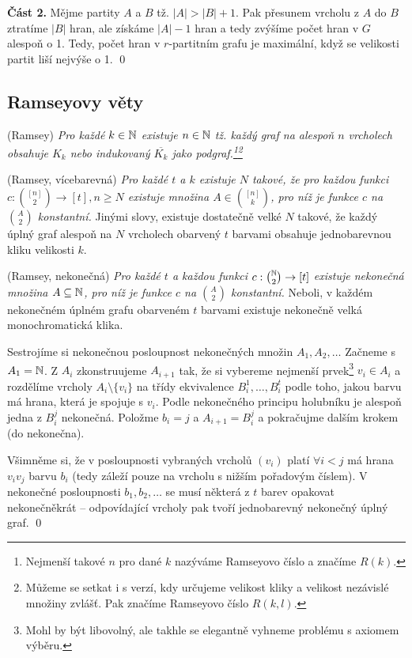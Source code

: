 \textbf{Část 2.} Mějme partity $A$ a $B$ tž. $|A| > |B| + 1$. Pak přesunem
vrcholu z $A$ do $B$ ztratíme $|B|$ hran, ale získáme $|A|-1$ hran a tedy
zvýšíme počet hran v $G$ alespoň o 1. Tedy, počet hran v $r$-partitním grafu je
maximální, když se velikosti partit liší nejvýše o 1. 
\qed

\subsection{Ramseyovy věty}

\vt (Ramsey) {\it Pro každé $k \in \mathbb{N}$ existuje $n \in \mathbb{N}$ tž. každý graf na alespoň $n$ vrcholech obsahuje $K_k$ nebo indukovaný $\overline{K_k}$ jako podgraf.\footnote{Nejmenší takové $n$ pro dané $k$ nazýváme Ramseyovo číslo a značíme $R(k)$.}\footnote{Můžeme se setkat i s verzí, kdy určujeme velikost kliky a velikost nezávislé množiny zvlášť. Pak značíme Ramseyovo číslo $R(k,l)$.}}

\vt (Ramsey, vícebarevná) {\it Pro každé $t$ a $k$ existuje $N$ takové, že pro každou funkci $c: {[n]\choose 2} \rightarrow [t], n\geq N$ existuje množina $A \in {[n]\choose k}$, pro níž je funkce $c$ na $A\choose 2$ konstantní.} Jinými slovy, existuje dostatečně velké $N$ takové, že každý úplný graf alespoň na $N$ vrcholech obarvený $t$ barvami obsahuje jednobarevnou kliku velikosti $k$.

\vt (Ramsey, nekonečná) {\it Pro každé $t$ a každou funkci $c: {\mathbb{N}\choose 2} \rightarrow [t]$ existuje nekonečná množina $A\subseteq \mathbb{N}$, pro níž je funkce $c$ na $A\choose 2$ konstantní.} Neboli, v každém nekonečném úplném grafu obarveném $t$ barvami existuje nekonečně velká monochromatická klika.

\dk Sestrojíme si nekonečnou posloupnost nekonečných množin $A_1, A_2, \dots$ Začneme s $A_1 = \mathbb{N}$. Z $A_i$ zkonstruujeme $A_{i+1}$ tak, že si vybereme nejmenší prvek\footnote{Mohl by být libovolný, ale takhle se elegantně vyhneme problému s axiomem výběru.} $v_i \in A_i$ a rozdělíme vrcholy $A_i \setminus \{v_i\}$ na třídy ekvivalence $B_i^1, \dots, B_i^t$ podle toho, jakou barvu má hrana, která je spojuje s $v_i$. Podle nekonečného principu holubníku je alespoň jedna z $B_i^j$ nekonečná. Položme $b_i = j$ a $A_{i+1} = B_i^j$ a pokračujme dalším krokem (do nekonečna).

Všimněme si, že v posloupnosti vybraných vrcholů $(v_i)$ platí $\forall i < j$ má hrana $v_iv_j$ barvu $b_i$ (tedy záleží pouze na vrcholu s nižším pořadovým číslem). V nekonečné posloupnosti $b_1,b_2,\dots$ se musí některá z $t$ barev opakovat nekonečněkrát -- odpovídající vrcholy pak tvoří jednobarevný nekonečný úplný graf.
\qed

